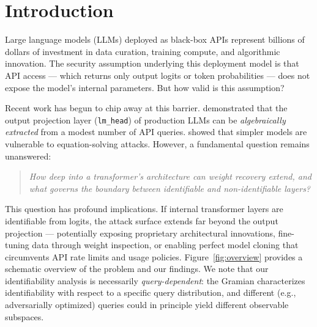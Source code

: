 \documentclass{article}
\newcommand{\bW}{\mathbf{W}}
\begin{document}
\begin{abstract}
The resulting attack setting is strictly black-box: only last-position logits and the public input-embedding table are used. We demonstrate the attack on a tied-embedding open-weight model (Qwen2.5-0.5B); untied architectures are discussed as an untested extension via Carlini's recovered pseudo-embedding $\hat{\bW}_{\text{eff}}^\top$. The 0.813 top-5 result should be read as an \emph{existence result at a demonstrated operating point} (4096 queries, CP rank 4864, 40 ALS iterations) rather than a full robustness or scaling characterization, which we leave for future work. The paper is thus a positive extraction result --- the first per-column recovery of $\bW_{\text{lm\_head}}$ beyond Carlini's second-order ceiling --- packaged with the observability theory that explains which internal weights remain out of reach for first-order attacks.
\end{abstract}

\section{Introduction}
\label{sec:intro}

Large language models (LLMs) deployed as black-box APIs represent billions of dollars of investment in data curation, training compute, and algorithmic innovation. The security assumption underlying this deployment model is that API access --- which returns only output logits or token probabilities --- does not expose the model's internal parameters. But how valid is this assumption?

Recent work has begun to chip away at this barrier. \citet{carlini2024stealing} demonstrated that the output projection layer (\texttt{lm\_head}) of production LLMs can be \emph{algebraically extracted} from a modest number of API queries. \citet{tramer2016stealing} showed that simpler models are vulnerable to equation-solving attacks. However, a fundamental question remains unanswered:

\begin{quote}
\emph{How deep into a transformer's architecture can weight recovery extend, and what governs the boundary between identifiable and non-identifiable layers?}
\end{quote}

This question has profound implications. If internal transformer layers are identifiable from logits, the attack surface extends far beyond the output projection --- potentially exposing proprietary architectural innovations, fine-tuning data through weight inspection, or enabling perfect model cloning that circumvents API rate limits and usage policies. Figure~\ref{fig:overview} provides a schematic overview of the problem and our findings. We note that our identifiability analysis is necessarily \emph{query-dependent}: the Gramian characterizes identifiability with respect to a specific query distribution, and different (e.g., adversarially optimized) queries could in principle yield different observable subspaces.
\end{document}
